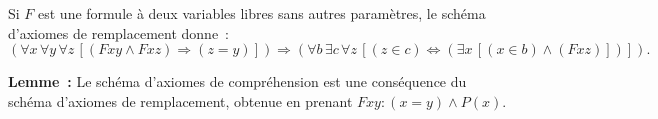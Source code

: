    \done 

\medskip

Si $F$ est une formule à deux variables libres sans autres paramètres, le schéma d'axiomes de remplacement donne :
\begin{equation*}
    \left( 
        \forall x \, \forall y \, \forall z \, \left[
            (F x y \wedge F x z) \Rightarrow (z = y)
        \right]
    \right)
    \Rightarrow
    \left(
        \forall b \, \exists c \, \forall z \, \left[
            (z \in c) \Leftrightarrow (\exists x \, [(x \in b) \wedge (F x z)])
        \right]
    \right)
.
\end{equation*}

\medskip

\noindent\textbf{Lemme :} Le schéma d'axiomes de compréhension est une conséquence du schéma d'axiomes de remplacement, obtenue en prenant $F x y : (x = y) \wedge P(x)$. 

\medskip

